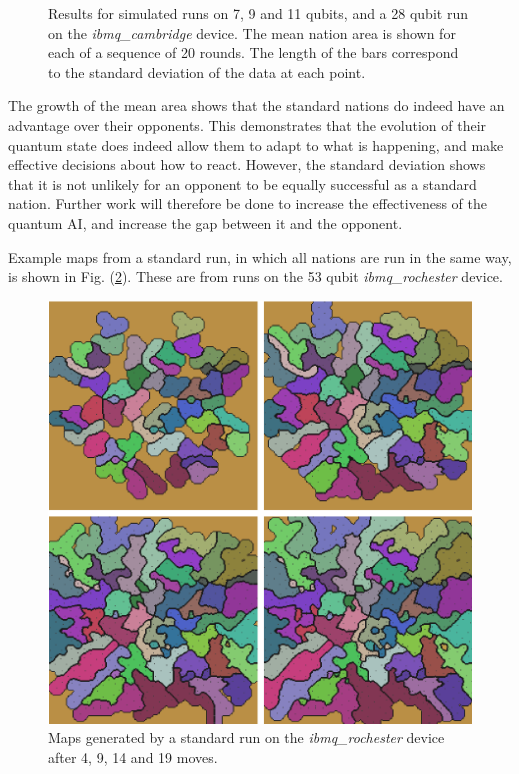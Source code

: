 \documentclass[conference]{IEEEtran}
\begin{document}
\begin{figure}[htbp]
\begin{center}
\caption{Results for simulated runs on 7, 9 and 11 qubits, and a 28 qubit run on the \textit{ibmq\_cambridge} device. The mean nation area is shown for each of a sequence of 20 rounds. The length of the bars correspond to the standard deviation of the data at each point.}
\label{default}
\end{center}
\end{figure}

The growth of the mean area shows that the standard nations do indeed have an advantage over their opponents. This demonstrates that the evolution of their quantum state does indeed allow them to adapt to what is happening, and make effective decisions about how to react. However, the standard deviation shows that it is not unlikely for an opponent to be equally successful as a standard nation. Further work will therefore be done to increase the effectiveness of the quantum AI, and increase the gap between it and the opponent.

Example maps from a standard run, in which all nations are run in the same way, is shown in Fig. (\ref{maps}). These are from runs on the 53 qubit \textit{ibmq\_rochester} device.

\begin{figure}[htbp]
\begin{center}
\includegraphics[width=0.95\columnwidth]{figures/maps.png}
\caption{Maps generated by a standard run on the \textit{ibmq\_rochester} device after 4, 9, 14 and 19 moves.}
\label{maps}
\end{center}
\end{figure}
\end{document}
